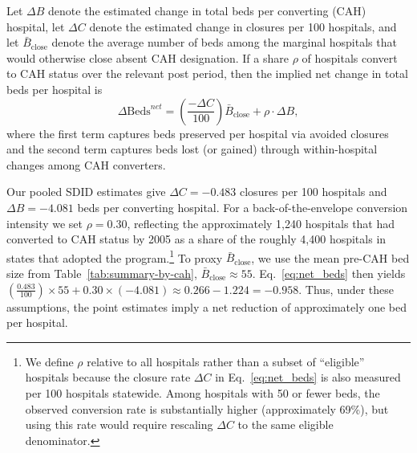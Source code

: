 \documentclass[a4paper, 12pt, twoside]{article}
\begin{document}
Let $\Delta B$ denote the estimated change in total beds per converting (CAH) hospital, let $\Delta C$ denote the estimated change in closures per 100 hospitals, and let $\bar B_{\text{close}}$ denote the average number of beds among the marginal hospitals that would otherwise close absent CAH designation. If a share $\rho$ of hospitals convert to CAH status over the relevant post period, then the implied net change in total beds per hospital is
\begin{equation}
\Delta \text{Beds}^{net} =
\left(\frac{-\Delta C}{100}\right)\bar B_{\text{close}} +
\rho \cdot \Delta B,
\label{eq:net_beds}
\end{equation}
where the first term captures beds preserved per hospital via avoided closures and the second term captures beds lost (or gained) through within-hospital changes among CAH converters.

Our pooled SDID estimates give $\Delta C=-0.483$ closures per 100 hospitals and $\Delta B=-4.081$ beds per converting hospital. For a back-of-the-envelope conversion intensity we set $\rho=0.30$, reflecting the approximately 1,240 hospitals that had converted to CAH status by 2005 as a share of the roughly 4,400 hospitals in states that adopted the program.\footnote{We define $\rho$ relative to all hospitals rather than a subset of ``eligible'' hospitals because the closure rate $\Delta C$ in Eq.~\eqref{eq:net_beds} is also measured per 100 hospitals statewide. Among hospitals with 50 or fewer beds, the observed conversion rate is substantially higher (approximately 69\%), but using this rate would require rescaling $\Delta C$ to the same eligible denominator.} To proxy $\bar B_{\text{close}}$, we use the mean pre-CAH bed size from Table~\ref{tab:summary-by-cah}, $\bar B_{\text{close}}\approx 55$. Eq.~\eqref{eq:net_beds} then yields $\left(\frac{0.483}{100}\right)\times 55 + 0.30\times(-4.081) \approx 0.266 - 1.224 = -0.958.$ Thus, under these assumptions, the point estimates imply a net reduction of approximately one bed per hospital.
\end{document}
